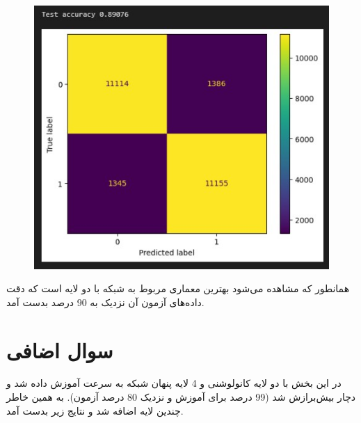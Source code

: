 \documentclass{article}
\begin{document}
\begin{figure}[!h]
    \centering\includegraphics[scale=.70]{./test-GRU-[16, 16]}
    \caption{}\label{fig.412}
\end{figure}




\cleardoublepage


همانطور که مشاهده می‌شود بهترین معماری مربوط به شبکه با دو لایه  است که دقت داده‌های آزمون آن نزدیک به 90 درصد بدست آمد.


\section{سوال اضافی}
در این بخش با دو لایه کانولوشنی و 4 لایه پنهان شبکه به سرعت آموزش داده شد و دچار بیش‌برازش شد (99 درصد برای آموزش و نزدیک 80 درصد آزمون). به همین خاطر چندین لایه  اضافه شد و نتایج زیر بدست آمد.
\end{document}
